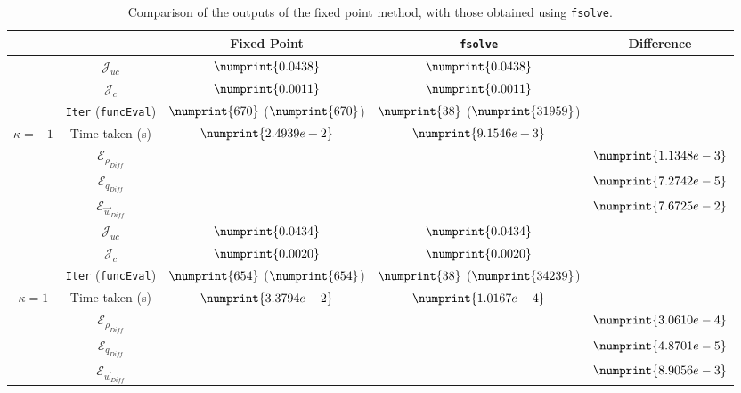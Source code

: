 \documentclass[11pt, a4paper]{article}
\theoremstyle{definition}
\newcommand{\adj}{q}
\begin{document}
\begin{table}
	\begin{tabular}{ | c | c || c | c | c ||}
		\hline
		\multicolumn{2}{|c||}{} & Fixed Point & \texttt{fsolve} & Difference   \\
		\hline
		\hline
		& $\mathcal{J}_{uc}$ & $\numprint{0.0438}$ & $\numprint{0.0438}$ &   \\
		& $\mathcal{J}_{c}$ & $\numprint{0.0011}$ & $\numprint{0.0011}$ &   \\
		& \texttt{Iter} (\texttt{funcEval}) & $\numprint{670}$ ($\numprint{670}$)  & $\numprint{38}$ ($\numprint{31959}$)  &   \\
		$\kappa =-1$ & Time taken (s) & $\numprint{2.4939e+2}$ & $\numprint{9.1546e+3}$ &   \\
		& $\mathcal{E}_{\rho_{Diff}}$ & & &$\numprint{1.1348e-3}$  \\
		& $\mathcal{E}_{\adj_{Diff}}$ & & &$\numprint{7.2742e-5}$  \\
		& $\mathcal{E}_{\vec{w}_{Diff}}$ & & & $\numprint{7.6725e-2}$  \\
		\hline
		& $\mathcal{J}_{uc}$ & $\numprint{0.0434}$ & $\numprint{0.0434}$ &   \\
		& $\mathcal{J}_{c}$ & $\numprint{0.0020}$ & $\numprint{0.0020}$ &   \\
		& \texttt{Iter} (\texttt{funcEval}) & $\numprint{654}$ ($\numprint{654}$)  & $\numprint{38}$ ($\numprint{34239}$)  &   \\
		$\kappa =1$ & Time taken (s) & $\numprint{3.3794e+2}$ & $\numprint{1.0167e+4}$ &   \\
		& $\mathcal{E}_{\rho_{Diff}}$ & & &$\numprint{3.0610e-4}$  \\
		& $\mathcal{E}_{\adj_{Diff}}$ & & &$\numprint{4.8701e-5}$  \\
		& $\mathcal{E}_{\vec{w}_{Diff}}$ & & & $\numprint{8.9056e-3}$  \\
		\hline
	\end{tabular}
	\caption{Comparison of the outputs of the fixed point method, with those obtained using \texttt{fsolve}.}
	\label{TabA3:Prob1}
\end{table}
\end{document}
